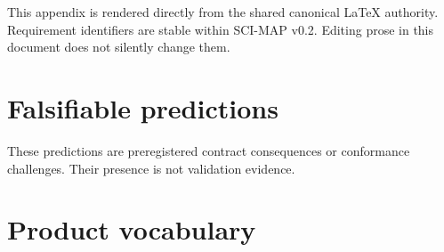 \documentclass[10pt]{article}
\begin{document}
This appendix is rendered directly from the shared canonical LaTeX authority.
Requirement identifiers are stable within SCI-MAP v0.2. Editing prose in this
document does not silently change them.

\renewcommand{\SCIMapRequirement}[4]{%
  \phantomsection\label{req:#1}%
  \noindent\textbf{\textcolor{MapNavy}{#1} -- #2.} #3\par\smallskip}
\begin{sloppypar}
\SCIMapRequirements
\end{sloppypar}

\clearpage
\section{Falsifiable predictions}\label{app:predictions}

These predictions are preregistered contract consequences or conformance
challenges. Their presence is not validation evidence.

\renewcommand{\SCIMapPrediction}[4]{%
  \phantomsection\label{pred:#1}%
  \noindent\textbf{\textcolor{MapNavy}{#1} -- #2.} #3
  \textit{Primary claim layer: #4.}\par\smallskip}
\SCIMapPredictions

\clearpage
\section{Product vocabulary}

\SCIMapProductRoleDefinition
\end{document}
